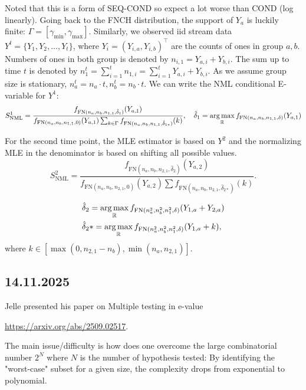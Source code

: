 Noted that this is a form of SEQ-COND so expect a lot worse than COND (log linearly).
Going back to the FNCH distribution, the support of $Y_a$ is luckily finite: $\Gamma=[\gamma_{\min}, \gamma_{\max}]$.
Similarly, we observed iid stream data $Y^t=\{Y_1,Y_2,\dots,Y_t\}$, where $Y_i=(Y_{i,a},Y_{i,b})^\intercal$ are the counts of ones in group $a, b$.
Numbers of ones in both group is denoted by $n_{i,1}=Y_{a,i}+Y_{b,i}$.
The sum up to time $t$ is denoted by $n_{1}^t=\sum_{i=1}^t n_{1,i}=\sum_{i=1}^t Y_{a,i}+Y_{b,i}$.
As we assume group size is stationary, $n_a^t=n_a\cdot  t,n_b^t=n_b\cdot t$.
We can write the NML conditional E-variable for $Y^1$:
\begin{equation*}
	S_{\mathrm{NML}}^1 = \frac{f_{\mathrm{FN}(n_a,n_b,n_{1,1},\hat{\delta}_{1})}(Y_{a,1})}{f_{\mathrm{FN}(n_a,n_b,n_{1,1},0)}(Y_{a,1}) \sum_{k\in\Gamma} f_{\mathrm{FN}(n_a,n_b,n_{1,1},\hat{\delta}_{1*})}(k)},
	\quad \hat{\delta}_1 = \argmax_{\Rf} f_{\mathrm{FN}(n_a,n_b,n_{1,1},\delta)}(Y_{a,1})
\end{equation*}

For the second time point, the MLE estimator is based on $Y^2$ and the normalizing MLE in the denominator is based on shifting all possible values.
\begin{equation*}
	S_{\mathrm{NML}}^2 = \frac{f_{\mathrm{FN}(n_a,n_b,n_{2,1},\hat{\delta}_{2})}(Y_{a,2})}{f_{\mathrm{FN}(n_a,n_b,n_{2,1},0)}(Y_{a,2}) \sum f_{\mathrm{FN}(n_a,n_b,n_{2,1},\hat{\delta}_{2*})}(k)}.
\end{equation*}

\begin{align*}
	 & \hat{\delta}_2 = \argmax_{\Rf} f_{\mathrm{FN}(n_a^2,n_b^2,n_1^2,\delta)}(Y_{1,a}+Y_{2,a}) \\
	 & \hat{\delta}_2* = \argmax_{\Rf} f_{\mathrm{FN}(n_a^2,n_b^2,n_1^2,\delta)}(Y_{1,a}+k),
\end{align*}
where $k \in [\max(0,n_{2,1}-n_b), \min(n_a, n_{2,1})]$.

\newpage

\subsection*{14.11.2025}

Jelle presented his paper on Multiple testing in e-value

\url{https://arxiv.org/abs/2509.02517}.

The main issue/difficulty is how does one overcome the large combinatorial number $2^N$ where $N$ is the number of hypothesis tested: By identifying the "worst-case" subset for a given size, the complexity drops from exponential to polynomial.


